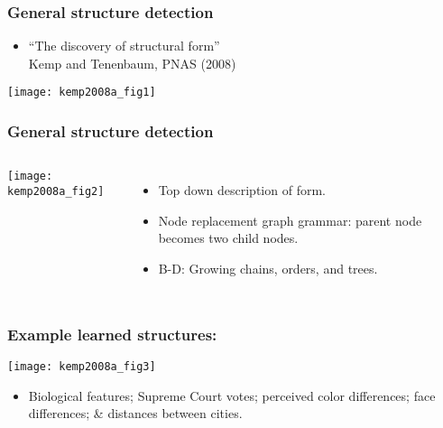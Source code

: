 \begin{frame}
  \frametitle{General structure detection}

  \begin{itemize}
  \item 
    ``The discovery of structural form''\\
    Kemp and Tenenbaum, PNAS (2008)\cite{kemp2008a}
  \end{itemize}
  
  \texttt{[image: kemp2008a\_fig1]}

\end{frame}

\begin{frame}
  \frametitle{General structure detection}
  
  \begin{columns}
    \texttt{[image: kemp2008a\_fig2]}
    \begin{itemize}
    \item<1->
      Top down description of form.
    \item<2->
      Node replacement graph grammar:
      parent node becomes two child nodes.
    \item<3->
      B-D: Growing chains, orders, and trees.
    \end{itemize}
  \end{columns}


\end{frame}

\begin{frame}
  \frametitle{Example learned structures:}
  
  \begin{center}
    \texttt{[image: kemp2008a\_fig3]}
  \end{center}

  \begin{itemize}
  \item 
    \small
    Biological features; 
    Supreme Court votes; 
    perceived color differences; 
    face differences; 
    \& distances between cities.
  \end{itemize}

\end{frame}

